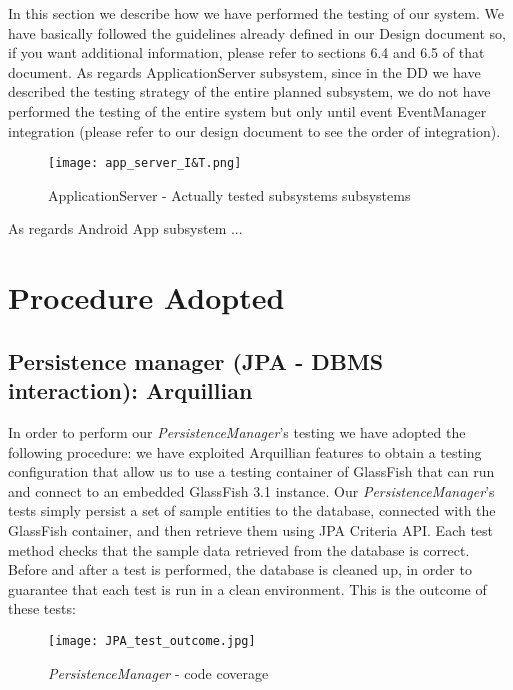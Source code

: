In this section we describe how we have performed the testing of our system.
We have basically followed the guidelines already defined in our Design document so, if you want additional information, please refer to sections 6.4 and 6.5 of that document.
As regards ApplicationServer subsystem, since in the DD we have described the testing strategy of the entire planned subsystem, we do not have performed the testing of the entire system but only until event EventManager integration (please refer to our design document to see the order of integration).\\
\begin{figure}[H]
	\begin{center}
		\hspace*{-40pt}
		\texttt{[image: app\_server\_I\&T.png]}
	\end{center}
\caption{ ApplicationServer - Actually tested subsystems subsystems}
\end{figure}
As regards Android App subsystem ...

\section{Procedure Adopted}
\subsection{Persistence manager (JPA - DBMS interaction): Arquillian}
In order to perform our \textit{PersistenceManager}'s testing we have adopted the following procedure: we have exploited Arquillian features to obtain a testing configuration that allow us to use a testing container of GlassFish that can run and connect to an embedded GlassFish 3.1 instance.
Our \textit{PersistenceManager}'s tests simply  persist a set of sample entities to the database, connected with the GlassFish container, and then retrieve them using JPA Criteria API.
Each test method checks that the sample data retrieved from the database is correct. Before and after a test is performed, the database is cleaned up, in order to guarantee that each test is run in a clean environment.
This is the outcome of these tests:
\begin{figure}[H]
	\begin{center}
		\texttt{[image: JPA\_test\_outcome.jpg]}
	\end{center}
\caption{ \textit{PersistenceManager} - code coverage}
\end{figure}

